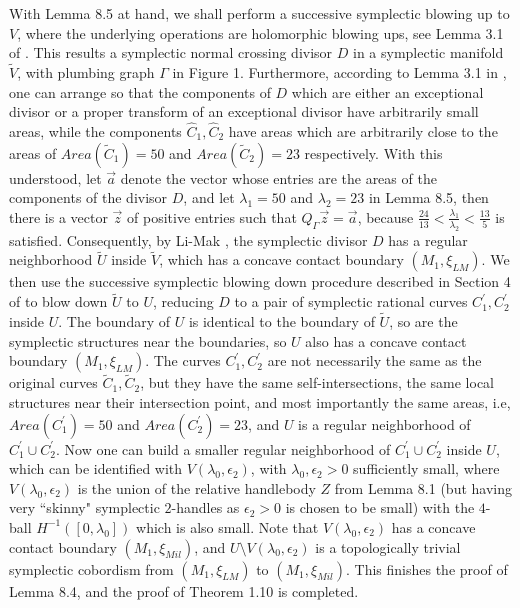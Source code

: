 \documentclass[11pt]{amsart}
\theoremstyle{plain}
\numberwithin{theorem}{section}
\theoremstyle{definition}
\begin{document}
With Lemma 8.5 at hand, we shall perform a successive symplectic blowing up to $V$, where the underlying operations are holomorphic blowing ups, see Lemma 3.1 of \cite{C5}. This results a symplectic normal crossing divisor $D$ in a symplectic manifold $\tilde{V}$, with plumbing graph $\Gamma$ in Figure 1. 
Furthermore, according to Lemma 3.1 in \cite{C5}, one can arrange so that the components of $D$ which are 
either an exceptional divisor or a proper transform of an exceptional divisor have arbitrarily small areas, while the components $\hat{C}_1, \hat{C}_2$ have areas which are arbitrarily close to the areas of $Area(\tilde{C}_1)=50$ and $Area(\tilde{C}_2)=23$ respectively. With this understood, let $\vec{a}$ denote the vector whose entries are the areas of the components of the divisor $D$, and let $\lambda_1=50$ and $\lambda_2=23$ in Lemma 8.5, then there is a vector $\vec{z}$ of positive entries such that $Q_\Gamma \vec{z}=\vec{a}$, because 
$\frac{24}{13}<\frac{\lambda_1}{\lambda_2}<\frac{13}{5}$ is satisfied. Consequently, by Li-Mak \cite{LM}, the symplectic divisor $D$ has a regular neighborhood $\tilde{U}$ inside $\tilde{V}$, which has a concave contact boundary $(M_1,\xi_{LM})$. We then use the successive
symplectic blowing down procedure described in Section 4 of \cite{C2} to blow down $\tilde{U}$ to $U$, reducing 
$D$ to a pair of symplectic rational curves $C_1^\prime,C_2^\prime$ inside $U$. The boundary of $U$ is identical to
the boundary of $\tilde{U}$, so are the symplectic structures near the boundaries, so $U$ also has a concave contact boundary $(M_1,\xi_{LM})$. The curves $C_1^\prime,C_2^\prime$ are not necessarily the same as 
the original curves $\tilde{C}_1,\tilde{C}_2$, but they have the same self-intersections, the same local structures near their intersection point, and most importantly the same areas, i.e, 
$Area({C}_1^\prime)=50$ and $Area({C}_2^\prime)=23$, and $U$ is a regular neighborhood of 
$C_1^\prime\cup C_2^\prime$. Now one can build a smaller regular neighborhood of 
$C_1^\prime\cup C_2^\prime$ inside $U$, which can be identified with $V(\lambda_0,\epsilon_2)$, 
with $\lambda_0,\epsilon_2>0$ sufficiently small, where $V(\lambda_0,\epsilon_2)$ is the union of the relative handlebody $Z$ from Lemma 8.1 (but having very ``skinny" symplectic $2$-handles as $\epsilon_2>0$
is chosen to be small) with the $4$-ball $H^{-1}([0,\lambda_0])$ which is also small. Note that $V(\lambda_0,\epsilon_2)$ has a concave contact boundary $(M_1,\xi_{Mil})$, and $U\setminus V(\lambda_0,\epsilon_2)$ is a  topologically trivial symplectic cobordism from $(M_1,\xi_{LM})$ to $(M_1,\xi_{Mil})$. This finishes the proof of Lemma 8.4, and the proof of Theorem 1.10 is completed. 
\end{document}
